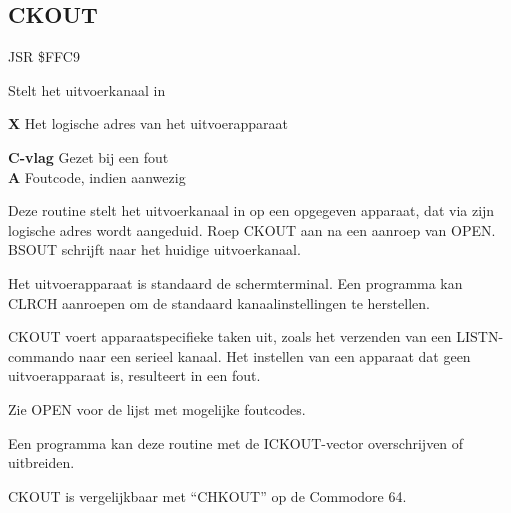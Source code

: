 
\newpage
\subsection{CKOUT}
\label{KERNAL Jump Table!CKOUT}
\begin{description}[leftmargin=2cm,style=nextline]
    \item [Adres:] JSR \$FFC9    \item [Omschrijving:] Stelt het uitvoerkanaal in    \item [Invoer:]        \textbf{X} Het logische adres van het uitvoerapparaat    \item [Uitvoer:]        \textbf{C-vlag} Gezet bij een fout \\        \textbf{A} Foutcode, indien aanwezig    \item [Opmerkingen:]        Deze routine stelt het uitvoerkanaal in op een opgegeven apparaat, dat via zijn logische adres wordt aangeduid. Roep CKOUT aan na een aanroep van OPEN. BSOUT schrijft naar het huidige uitvoerkanaal.

        Het uitvoerapparaat is standaard de schermterminal. Een programma kan CLRCH aanroepen om de standaard kanaalinstellingen te herstellen.

        CKOUT voert apparaatspecifieke taken uit, zoals het verzenden van een LISTN-commando naar een serieel kanaal. Het instellen van een apparaat dat geen uitvoerapparaat is, resulteert in een fout.

        Zie OPEN voor de lijst met mogelijke foutcodes.

        Een programma kan deze routine met de ICKOUT-vector overschrijven of uitbreiden.

        CKOUT is vergelijkbaar met ``CHKOUT'' op de Commodore 64.    \item [Voorbeeld:]
\end{description}



\newpage
